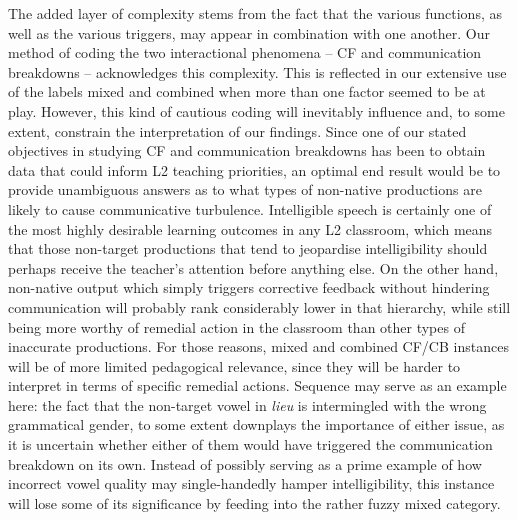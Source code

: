 \documentclass[output=paper,colorlinks,citecolor=brown,modfonts,nonflat]{../langscibook}
\begin{document}
The added layer of complexity stems from the fact that the various functions, as well as the various triggers, may appear in combination with one another. Our method of coding the two interactional phenomena – CF and communication breakdowns – acknowledges this complexity. This is reflected in our extensive use of the labels mixed and combined when more than one factor seemed to be at play. However, this kind of cautious coding will inevitably influence and, to some extent, constrain the interpretation of our findings. Since one of our stated objectives in studying CF and communication breakdowns has been to obtain data that could inform L2 teaching priorities, an optimal end result would be to provide unambiguous answers as to what types of non-native productions are likely to cause communicative turbulence. Intelligible speech is certainly one of the most highly desirable learning outcomes in any L2 classroom, which means that those non-target productions that tend to jeopardise intelligibility should perhaps receive the teacher’s attention before anything else. On the other hand, non-native output which simply triggers corrective feedback without hindering communication will probably rank considerably lower in that hierarchy, while still being more worthy of remedial action in the classroom than other types of inaccurate productions. For those reasons, mixed and combined CF/CB instances will be of more limited pedagogical relevance, since they will be harder to interpret in terms of specific remedial actions. Sequence  may serve as an example here: the fact that the non-target vowel in \textit{lieu} is intermingled with the wrong grammatical gender, to some extent downplays the importance of either issue, as it is uncertain whether either of them would have triggered the communication breakdown on its own. Instead of possibly serving as a prime example of how incorrect vowel quality may single-handedly hamper intelligibility, this instance will lose some of its significance by feeding into the rather fuzzy mixed category.
\end{document}
